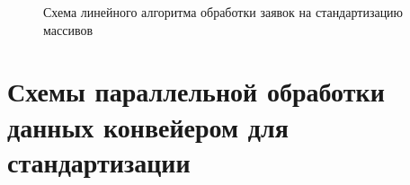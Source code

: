 \newpage
\begin{figure}[h!]
	
	
	\caption{Схема линейного алгоритма обработки заявок на стандартизацию массивов}
	
	\label{fig:linear}
	
\end{figure}

\newpage
\section{Схемы параллельной обработки данных конвейером для стандартизации}


